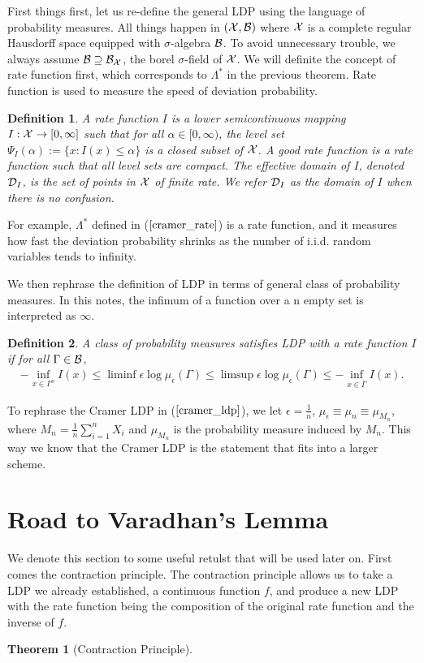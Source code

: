 \documentclass[10pt]{article}
\def\D{{\cal D}}
\def\X{{\cal X}}
\def\B{{\cal B}}
\newtheorem{definition}{\bf Definition}
\newtheorem{theorem}{\bf Theorem}
\newenvironment{Proof of lemma}{\noindent{\bf Proof of Lemma}}{\hfill$\Box$\newline}
\newenvironment{Proof of claim}{\noindent{\bf Proof of claim}}{\hfill$\Box$\newline}
\newenvironment{Proof of theorem}{\noindent{\bf Proof of Theorem}}{\hfill\scriptsize{$\Box$}\newline}
\newenvironment{Proof of theorems}{\noindent{\bf Proof of Theorems}}{\hfill$\Box$\newline}
\newenvironment{Proof of proposition}{\noindent{\bf Proof of Proposition}}{\hfill$\Box$\newline}
\newenvironment{Proof of propositions}{\noindent{\bf Proof of Propositions}}{\hfill$\Box$\newline}
\newenvironment{Proof of exercise}{\noindent{\it Proof of Exercise:}}{\hfill$\Box$}
\numberwithin{equation}{section}
\begin{document}
First things first, let us re-define the general LDP using the language of probability measures. All things happen in $(\X,\B)$ where $\X$ is a complete regular Hausdorff space equipped with $\sigma$-algebra $\B$. To avoid unnecessary trouble, we always assume $\B \supseteq \B_{\X}$, the borel $\sigma$-field of $\X$. We will definite the concept of rate function first, which corresponds to $\Lambda^{\ast}$ in the previous theorem. Rate function is used to measure the speed of deviation probability.
\begin{definition}
    A rate function $I$ is a lower semicontinuous mapping $I: \X \to [0,\infty]$ such that for all $\alpha \in [0,\infty)$, the level set $\Psi_I(\alpha) := \{x: I(x) \leq \alpha\}$ is a closed subset of $\X$. A good rate function is a rate function such that all level sets are compact. The effective domain of $I$, denoted $\D_I$, is the set of points in $\X$ of finite rate. We refer $\D_I$ as the domain of $I$ when there is no confusion.
\end{definition}
For example, $\Lambda^*$ defined in ($\ref{cramer_rate}$) is a rate function, and it measures how fast the deviation probability shrinks as the number of i.i.d. random variables tends to infinity.

We then rephrase the definition of LDP in terms of general class of probability measures. In this notes, the infimum of a function over a n empty set is interpreted as $\infty$.
\begin{definition}
    A class of probability measures satisfies LDP with a rate function $I$ if for all $\Gamma \in \B$,
    \begin{align} \label{ldp_bound}
        - \inf_{x \in \Gamma^o} I(x) \leq \liminf \epsilon \log \mu_{\epsilon}(\Gamma) \leq \limsup \epsilon \log \mu_{\epsilon}(\Gamma) \leq - \inf_{x \in \bar{\Gamma}} I(x).
    \end{align}
\end{definition}
To rephrase the Cramer LDP in ($\ref{cramer_ldp}$), we let $\epsilon = \frac{1}{n}$, $\mu_{\epsilon} \equiv \mu_n \equiv \mu_{M_n}$, where $M_n=\frac{1}{n}\sum_{i=1}^n X_i$ and $\mu_{M_n}$ is the probability measure induced by $M_n$. This way we know that the Cramer LDP is the statement that fits into a larger scheme.
\section{Road to Varadhan's Lemma}
We denote this section to some useful retulst that will be used later on. First comes the contraction principle. The contraction principle allows us to take a LDP we already established, a continuous function $f$, and produce a new LDP with the rate function being the composition of the original rate function and the inverse of $f$.
\begin{theorem}[Contraction Principle]
    
\end{theorem}
\end{document}
